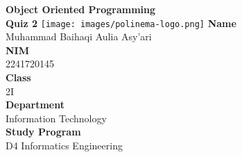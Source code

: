 \documentclass[12pt,titlepage]{article}
\newcommand{\vSubject}{Object Oriented Programming}
\newcommand{\vSubtitle}{Quiz 2}
\newcommand{\vName}{Muhammad Baihaqi Aulia Asy'ari}
\newcommand{\vNIM}{2241720145}
\newcommand{\vClass}{2I}
\newcommand{\vDepartment}{Information Technology}
\newcommand{\vStudyProgram}{D4 Informatics Engineering}
\begin{document}
\begin{titlepage}
    \centering
    \vfill
    {\bfseries\LARGE
        \vSubject\\
        \vskip0.25cm
        \vSubtitle
    }
    \vfill
    \texttt{[image: images/polinema-logo.png]}
    \vfill
    {
        \textbf{Name}\\
        \vName\\
        \vskip0.5cm
        \textbf{NIM}\\
        \vNIM\\
        \vskip0.5cm
        \textbf{Class}\\
        \vClass\\
        \vskip0.5cm
        \textbf{Department}\\
        \vDepartment\\
        \vskip0.5cm
        \textbf{Study Program}\\
        \vStudyProgram
    }
\end{titlepage}

\newpage
\end{document}
